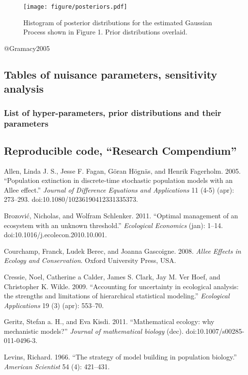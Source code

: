 \documentclass[author-year, review]{elsarticle} %
\begin{document}
\begin{figure}[htbp]
\centering
\texttt{[image: figure/posteriors.pdf]}
\caption{Histogram of posterior distributions for the estimated Gaussian
Process shown in Figure 1. Prior distributions overlaid.}
\end{figure}

@Gramacy2005

\subsection{Tables of nuisance parameters, sensitivity analysis}

\subsubsection{List of hyper-parameters, prior distributions and their
parameters}

\subsection{Reproducible code, ``Research Compendium''}

Allen, Linda J. S., Jesse F. Fagan, Göran Högnäs, and Henrik Fagerholm.
2005. ``Population extinction in discrete-time stochastic population
models with an Allee effect.'' \emph{Journal of Difference Equations and
Applications} 11 (4-5) (apr): 273--293.
doi:10.1080/10236190412331335373.

Brozović, Nicholas, and Wolfram Schlenker. 2011. ``Optimal management of
an ecosystem with an unknown threshold.'' \emph{Ecological Economics}
(jan): 1--14. doi:10.1016/j.ecolecon.2010.10.001.

Courchamp, Franck, Ludek Berec, and Joanna Gascoigne. 2008. \emph{Allee
Effects in Ecology and Conservation}. Oxford University Press, USA.

Cressie, Noel, Catherine a Calder, James S. Clark, Jay M. Ver Hoef, and
Christopher K. Wikle. 2009. ``Accounting for uncertainty in ecological
analysis: the strengths and limitations of hierarchical statistical
modeling.'' \emph{Ecological Applications} 19 (3) (apr): 553--70.

Geritz, Stefan a. H., and Eva Kisdi. 2011. ``Mathematical ecology: why
mechanistic models?'' \emph{Journal of mathematical biology} (dec).
doi:10.1007/s00285-011-0496-3.

Levins, Richard. 1966. ``The strategy of model building in population
biology.'' \emph{American Scientist} 54 (4): 421--431.
\end{document}
